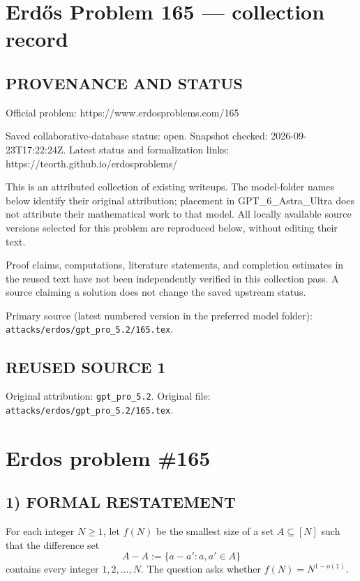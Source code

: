 \section*{Erd\H{o}s Problem 165 --- collection record}

\subsection*{PROVENANCE AND STATUS}
Official problem: https://www.erdosproblems.com/165

Saved collaborative-database status: open.
Snapshot checked: 2026-09-23T17:22:24Z.
Latest status and formalization links: https://teorth.github.io/erdosproblems/

This is an attributed collection of existing writeups. The model-folder names below identify their original attribution; placement in GPT\_6\_Astra\_Ultra does not attribute their mathematical work to that model. All locally available source versions selected for this problem are reproduced below, without editing their text.

Proof claims, computations, literature statements, and completion estimates in the reused text have not been independently verified in this collection pass. A source claiming a solution does not change the saved upstream status.

Primary source (latest numbered version in the preferred model folder): \texttt{attacks/erdos/gpt\_pro\_5.2/165.tex}.

\subsection*{REUSED SOURCE 1}
Original attribution: \texttt{gpt\_pro\_5.2}.
Original file: \texttt{attacks/erdos/gpt\_pro\_5.2/165.tex}.

\section*{Erdos problem \#165}

\subsection*{1) FORMAL RESTATEMENT}
For each integer $N\ge 1$, let $f(N)$ be the smallest size of a set $A\subseteq [N]$ such that the difference set
\[
A-A:=\{a-a':a,a'\in A\}
\]
contains every integer $1,2,\dots,N$.
The question asks whether $f(N)=N^{1-o(1)}$.

